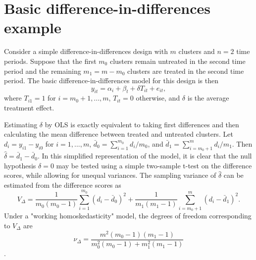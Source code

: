 \documentclass{article}\usepackage[]{graphicx}\usepackage[]{color}
\begin{document}
\section{Basic difference-in-differences example}

Consider a simple difference-in-differences design with $m$ clusters and $n = 2$ time periods. 
Suppose that the first $m_0$ clusters remain untreated in the second time period and the remaining $m_1 = m - m_0$ clusters are treated in the second time period.
The basic difference-in-differences model for this design is then
\begin{equation}
\label{eq:DID}
y_{it} = \alpha_i + \beta_t + \delta T_{it} + e_{it},
\end{equation}
where $T_{i1} = 1$ for $i = m_0 + 1,...,m$, $T_{it} = 0$ otherwise, and $\delta$ is the average treatment effect. 

Estimating $\delta$ by OLS is exactly equivalent to taking first differences and then calculating the mean difference between treated and untreated clusters. Let $d_i = y_{i1} - y_{i0}$ for $i = 1,...,m$, $\bar{d}_0 = \sum_{i=1}^{m_0} d_i / m_0$, and $\bar{d}_1 = \sum_{i=m_0 + 1}^m d_i / m_1$. Then $\hat\delta = \bar{d}_1 - \bar{d}_0$. In this simplified representation of the model, it is clear that the null hypothesis $\delta = 0$ may be tested using a simple two-sample t-test on the difference scores, while allowing for unequal variances. The sampling variance of $\hat\delta$ can be estimated from the difference scores as 
\[
V_{\Delta} = \frac{1}{m_0 (m_0 - 1)}\sum_{i=1}^{m_0} \left(d_i - \bar{d}_0\right)^2 + \frac{1}{m_1 (m_1 - 1)}\sum_{i=m_0 + 1}^{m} \left(d_i - \bar{d}_1\right)^2.
\]
Under a "working homoskedasticity" model, the degrees of freedom corresponding to $V_{\Delta}$ are 
\[
\nu_\Delta = \frac{m^2 (m_0 - 1) (m_1 - 1)}{m_0^2 (m_0 - 1) + m_1^2 (m_1 - 1)}
\]
\citep{Imbens2015robust}.
\end{document}
